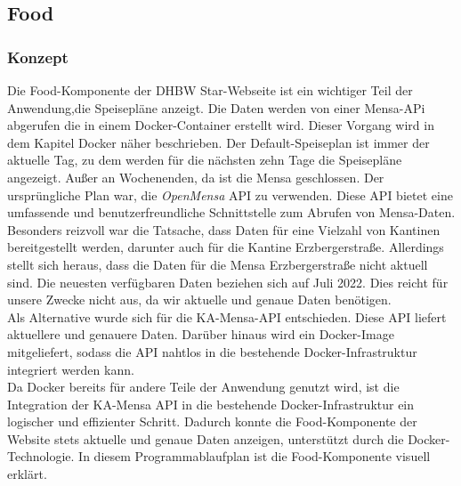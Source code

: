 \subsection{Food}
\subsubsection{Konzept}
Die Food-Komponente der DHBW Star-Webseite ist ein wichtiger Teil der Anwendung,die Speisepläne anzeigt.
Die Daten werden von einer Mensa-APi abgerufen die in einem Docker-Container erstellt wird. Dieser Vorgang wird in dem Kapitel Docker näher beschrieben.
Der Default-Speiseplan ist immer der aktuelle Tag, zu dem werden für die nächsten zehn Tage die Speisepläne angezeigt. Außer an Wochenenden, da ist die Mensa geschlossen.
Der ursprüngliche Plan war, die \emph{OpenMensa} API zu verwenden. Diese API bietet eine umfassende und benutzerfreundliche Schnittstelle zum Abrufen von Mensa-Daten. Besonders reizvoll war die Tatsache, dass  Daten für eine Vielzahl von Kantinen bereitgestellt werden, darunter auch für die Kantine Erzbergerstraße.\cite{openmensa}
Allerdings stellt sich heraus, dass die Daten für die Mensa Erzbergerstraße nicht aktuell sind. Die neuesten verfügbaren Daten beziehen sich auf Juli 2022. Dies reicht für unsere Zwecke nicht aus, da wir aktuelle und genaue Daten benötigen.\cite{openmensa-canteen33}\\
Als Alternative wurde sich für die  KA-Mensa-API entschieden. Diese API liefert aktuellere und genauere Daten. Darüber hinaus wird ein Docker-Image mitgeliefert, sodass die API nahtlos in die bestehende Docker-Infrastruktur integriert werden kann.\cite{ka-mensa-api} \\
Da Docker bereits für andere Teile der Anwendung genutzt wird, ist die Integration der KA-Mensa API in die  bestehende Docker-Infrastruktur ein logischer und effizienter Schritt. Dadurch konnte die Food-Komponente der Website stets aktuelle und genaue Daten anzeigen, unterstützt durch die Docker-Technologie.
In diesem Programmablaufplan ist die Food-Komponente visuell erklärt.\\
